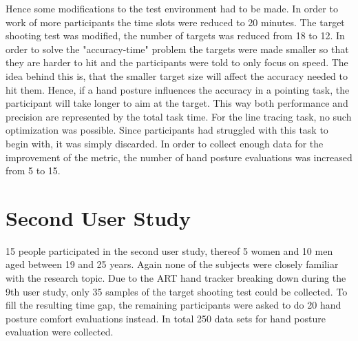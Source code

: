 Hence some modifications to the test environment had to be made. In order to work of more participants the time slots were reduced to 20 minutes. The target shooting test was modified, the number of targets was reduced from 18 to 12. In order to solve the "accuracy-time" problem the targets were made smaller so that they are harder to hit and the participants were told to only focus on speed. The idea behind this is, that the smaller target size will affect the accuracy needed to hit them. Hence, if a hand posture influences the accuracy in a pointing task, the participant will take longer to aim at the target. This way both performance and precision are represented by the total task time. 
For the line tracing task, no such optimization was possible. Since participants had struggled with this task to begin with, it was simply discarded.
In order to collect enough data for the improvement of the metric, the number of hand posture evaluations was increased from 5 to 15.

\section{Second User Study}

15 people participated in the second user study, thereof 5 women and 10 men aged between 19 and 25 years. Again none of the subjects were closely familiar with the research topic.
Due to the ART hand tracker breaking down during the 9th user study, only 35 samples of the target shooting test could be collected. To fill the resulting time gap, the remaining participants were asked to do 20 hand posture comfort evaluations instead.
In total 250 data sets for hand posture evaluation were collected.